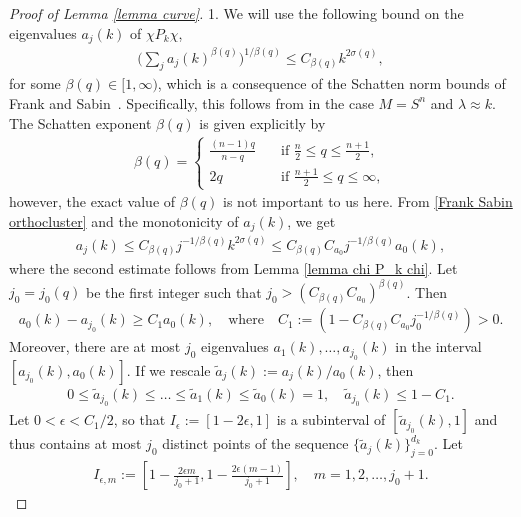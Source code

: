 \documentclass[12pt]{amsart}
\newcommand\eps{\epsilon}
\begin{document}
\begin{proof}[Proof of Lemma \ref{lemma curve}]
1. We will use the following bound on the eigenvalues $a_j(k)$ of $\chi P_k \chi$,
\begin{align}\label{Frank Sabin orthocluster}
 \Big(\sum_j a_j(k)^{\beta(q)}\Big)^{1/\beta(q)}\leq C_{\beta(q)} k^{2\sigma(q)},   
\end{align}
for some $\beta(q)\in [1,\infty)$, which is a consequence of the Schatten norm bounds of Frank and Sabin~\cite{MR3682666}. Specifically, this follows from \cite[Remark 6]{MR3682666} in the case $M=S^n$ and $\lambda\approx k$. The Schatten exponent $\beta(q)$ is given explicitly by 
\begin{align}\label{def. beta(q)}
    \beta(q)=\begin{cases}
        \frac{(n-1)q}{n-q}\quad &\mbox{if } \frac{n}{2}\leq  q\leq \frac{n+1}{2},\\
        2q\quad &\mbox{if } \frac{n+1}{2}\leq q\leq \infty, 
    \end{cases} 
\end{align}
however, the exact value of $\beta(q)$ is not important to us here. From \eqref{Frank Sabin orthocluster} and the monotonicity of $a_j(k)$, we get
\begin{align}
 a_j(k)\leq C_{\beta(q)} j^{-1/\beta(q)} k^{2\sigma(q)}\leq C_{\beta(q)}C_{a_0} j^{-1/\beta(q)} a_0(k),
\end{align}
where the second estimate follows from Lemma \ref{lemma chi P_k chi}.
Let $j_0=j_0(q)$ be the first integer such that $j_0>(C_{\beta(q)}C_{a_0})^{\beta(q)}$. 
Then 
\begin{align}
    a_0(k)-a_{j_0}(k)\geq C_1a_0(k),\quad \mbox{where}\quad C_1:=(1-C_{\beta(q)}C_{a_0}j_0^{-1/\beta(q)})>0.
\end{align}
Moreover, there are at most $j_0$ eigenvalues $a_1(k),\ldots,a_{j_0}(k)$ in the interval $[a_{j_0}(k),a_0(k)]$. 
If we rescale $\tilde{a}_j(k):=a_j(k)/a_0(k)$, then
\begin{align}
0\leq \tilde{a}_{j_0}(k)\leq \ldots \leq \tilde{a}_{1}(k)\leq  \tilde{a}_{0}(k)=1,\quad   \tilde{a}_{j_0}(k)\leq 1-C_1.
\end{align}
Let $0<\eps<C_1/2$, so that $I_{\eps}:=[1-2\eps,1]$ is a subinterval of $[\tilde{a}_{j_0}(k),1]$ and thus contains at most $j_0$ distinct points of the sequence $\{\tilde{a}_j(k)\}_{j=0}^{d_k}$. Let
\begin{align}
    I_{\eps,m}:=[1-\frac{2\eps m}{j_0+1},1-\frac{2\eps (m-1)}{j_0+1}],\quad m=1,2,\ldots, j_0+1.
\end{align}

\end{proof}
\end{document}
